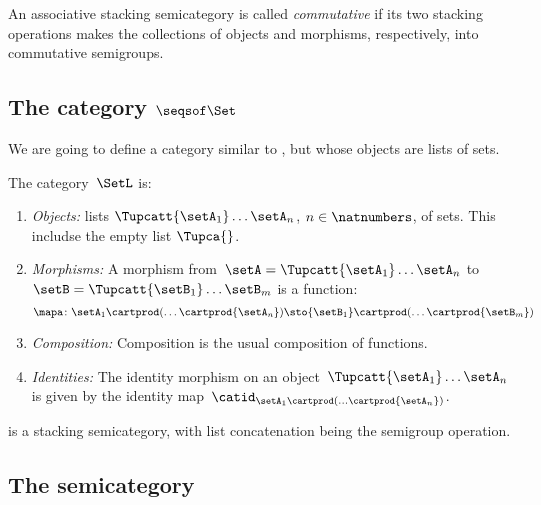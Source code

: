 \begin{definition}
An associative stacking semicategory is called \emph{commutative} if its two stacking operations makes the collections of objects and morphisms, respectively, into commutative semigroups.
\end{definition}

\subsection{The category $\seqsof\Set$}


We are going to define a category similar to \Set, but whose objects are lists of sets.


\begin{definition}
    \label{def:SetL}
    The category~$\SetL$ is:
    \begin{enumerate}
        \item \emph{Objects:} lists $\Tupcatt {\setA_1}  \dots {\setA_n}$, $n \in \natnumbers$, of sets. This includse the empty list $\Tupca {}$.
        \item \emph{Morphisms:}
              A morphism from~$\setA =\Tupcatt {\setA_1}  \dots {\setA_n}$ to~$\setB = \Tupcatt {\setB_1} \dots {\setB_m}$ is a function:
              \begin{equation*}
                  \mapa\colon {\setA_1} \cartprod (\ldots \cartprod {\setA_n}) \sto {\setB_1} \cartprod (\ldots \cartprod {\setB_m})
              \end{equation*}
        \item \emph{Composition:}
              Composition is the usual composition of functions.
        \item \emph{Identities:}
              The identity morphism on an object~$\Tupcatt {\setA_1} \dots {\setA_n}$ is given by the identity map~$\catid_{{\setA_1} \cartprod (\ldots \cartprod {\setA_n})}$.
    \end{enumerate}
\end{definition}



\SetL  is a stacking semicategory, with list concatenation being the semigroup operation.


\subsection{The semicategory \Effects}

